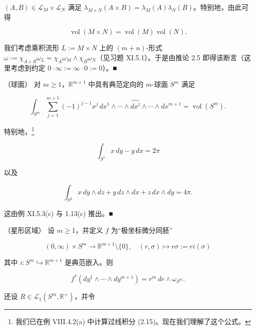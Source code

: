 \begin{example}

\begin{items}
\item

$ (A,B) \in \mathcal{L}_M \times \mathcal{L}_N $ 满足 $ \lambda_{M \times N}(A \times B) = \lambda_M(A)\lambda_N(B) $。特别地，由此可得

\[
\operatorname{vol}(M \times N) = \operatorname{vol}(M)\operatorname{vol}(N) .
\]

\proofhead
我们考虑乘积流形 $ L := M \times N $ 上的 $ (m+n) $-形式 $ \omega := \chi_{A \times B}\omega_L = \chi_A\omega_M \wedge \chi_B\omega_N $（见习题 XI.5.1）。于是由推论 2.5 即得该断言（这里考虑到约定 $ 0 \cdot \infty := \infty \cdot 0 := 0 $）。\nobreak\hspace{0.35em}■
\item

（球面） 对 $ m \ge 1 $，$ \mathbb{R}^{m+1} $ 中具有典范定向的 $ m $-球面 $ S^m $ 满足

\[
\int_{S^m} \sum_{j=1}^{m+1} (-1)^{j-1} x^j\,dx^1 \wedge \cdots \wedge \widehat{dx^j} \wedge \cdots \wedge dx^{m+1} = \operatorname{vol}(S^m) .
\]

特别地，\footnote{我们已在例 VIII.4.2(a) 中计算过线积分 (2.15)。现在我们理解了这个公式。}

\begin{equation}
\int_{S^1} x\,dy - y\,dx = 2\pi\tag{2.15}
\end{equation}

以及

\[
\int_{S^2} x\,dy \wedge dz + y\,dz \wedge dx + z\,dx \wedge dy = 4\pi .
\]

\proofhead
这由例 XI.5.3(c) 与 1.13(c) 推出。\nobreak\hspace{0.35em}■
\item

（星形区域） 设 $ m \ge 1 $，并定义 $ f $ 为“极坐标微分同胚”

\[
(0,\infty) \times S^m \to \mathbb{R}^{m+1}\setminus\{0\} , \quad (r,\sigma) \mapsto r\sigma := ri(\sigma)
\]

其中 $ i: S^m \hookrightarrow \mathbb{R}^{m+1} $ 是典范嵌入。则

\begin{equation}
f^*(dy^1 \wedge \cdots \wedge dy^{m+1}) = r^m\,dr \wedge \omega_{S^m} .\tag{2.16}
\end{equation}

还设 $ R \in \mathcal{L}_1(S^m, \mathbb{R}^+) $，并令


\end{items}
\end{example}
